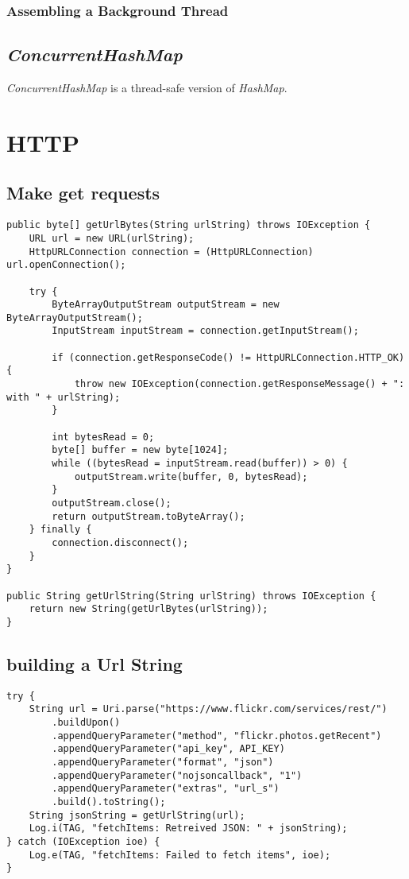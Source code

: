 \documentclass[]{article}
\renewcommand{\it}[1]{\textit{#1}}
\begin{document}
\subsubsection{Assembling a Background Thread}

\subsection{\it{ConcurrentHashMap}}
\it{ConcurrentHashMap} is a thread-safe version of \it{HashMap}.


\section{HTTP}
\subsection{Make get requests}
\begin{lstlisting}
public byte[] getUrlBytes(String urlString) throws IOException {
	URL url = new URL(urlString);
	HttpURLConnection connection = (HttpURLConnection) url.openConnection();

	try {
		ByteArrayOutputStream outputStream = new ByteArrayOutputStream();
		InputStream inputStream = connection.getInputStream();

		if (connection.getResponseCode() != HttpURLConnection.HTTP_OK) {
			throw new IOException(connection.getResponseMessage() + ": with " + urlString);
		}

		int bytesRead = 0;
		byte[] buffer = new byte[1024];
		while ((bytesRead = inputStream.read(buffer)) > 0) {
			outputStream.write(buffer, 0, bytesRead);
		}
		outputStream.close();
		return outputStream.toByteArray();
	} finally {
		connection.disconnect();
	}
}

public String getUrlString(String urlString) throws IOException {
	return new String(getUrlBytes(urlString));
}
\end{lstlisting}

\subsection{building a Url String}
\begin{lstlisting}
try {
	String url = Uri.parse("https://www.flickr.com/services/rest/")
		.buildUpon()
		.appendQueryParameter("method", "flickr.photos.getRecent")
		.appendQueryParameter("api_key", API_KEY)
		.appendQueryParameter("format", "json")
		.appendQueryParameter("nojsoncallback", "1")
		.appendQueryParameter("extras", "url_s")
		.build().toString();
	String jsonString = getUrlString(url);
	Log.i(TAG, "fetchItems: Retreived JSON: " + jsonString);
} catch (IOException ioe) {
	Log.e(TAG, "fetchItems: Failed to fetch items", ioe);
}
\end{lstlisting}
\end{document}
